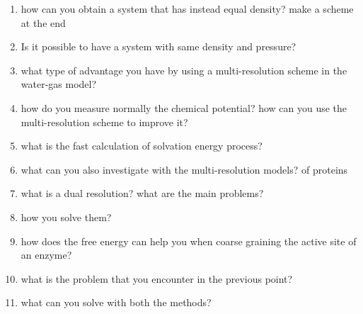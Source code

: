 {\begin{itemize}
\begin{enumerate}
        \item how can you obtain a system that has instead equal density? make a scheme at the end
        \item Is it possible to have a system with same density and pressure?
        \item what type of advantage you have by using a multi-resolution scheme in the water-gas model?
        \item how do you measure normally the chemical potential? how can you use the multi-resolution scheme to improve it?
        \item what is the fast calculation of solvation energy process?
        \item what can you also investigate with the multi-resolution models? of proteins
        \item what is a dual resolution? what are the main problems?
        \item how you solve them?
        \item how does the free energy can help you when coarse graining the active site of an enzyme?
        \item what is the problem that you encounter in the previous point?
        \item what can you solve with both the methods?
    \end{enumerate}
\end{itemize}
}